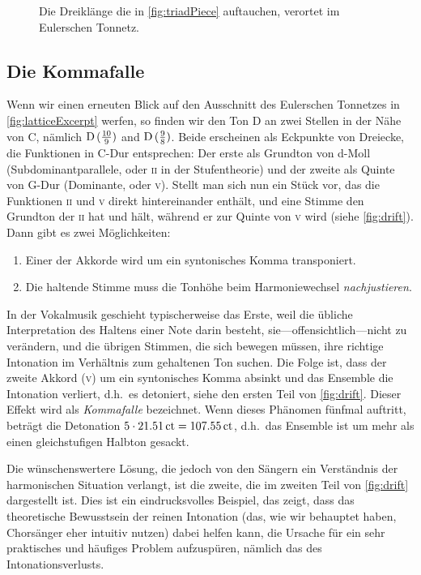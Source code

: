 \documentclass[ngerman,11pt]{scrartcl}
\begin{document}
\begin{figure}
  
  \caption{Die Dreiklänge die in \cref{fig:triadPiece} auftauchen, verortet im
  	Eulerschen Tonnetz.}\label{fig:chordsLattice}
\end{figure}

\subsection{Die Kommafalle}

Wenn wir einen erneuten Blick auf den Ausschnitt des Eulerschen Tonnetzes in \cref{fig:latticeExcerpt} werfen, so finden wir den Ton D an zwei Stellen in der Nähe von C, nämlich \naturalm $\text{D}\,(\frac{10}9)$ and $\text{D}\,(\frac98)$. Beide erscheinen als Eckpunkte von Dreiecke, die Funktionen in C-Dur entsprechen: Der erste als Grundton von d-Moll (Subdominantparallele, oder \textsc{ii} in der Stufentheorie) und der zweite als Quinte von G-Dur (Dominante, oder \textsc{v}). Stellt man sich nun ein Stück vor, das die Funktionen \textsc{ii} und \textsc{v} direkt hintereinander enthält, und eine Stimme den Grundton der \textsc{ii} hat und hält, während er zur Quinte von \textsc{v} wird (siehe \cref{fig:drift}). Dann gibt es zwei Möglichkeiten:


\begin{enumerate}[itemsep=0em]
\item Einer der Akkorde wird um ein syntonisches Komma transponiert.
\item Die haltende Stimme muss die Tonhöhe beim Harmoniewechsel 
  \emph{nachjustieren}.
\end{enumerate}%
%
In der Vokalmusik geschieht typischerweise das Erste, weil die übliche
Interpretation des Haltens einer Note darin besteht, sie—offensichtlich—nicht zu
verändern, und die übrigen Stimmen, die sich bewegen müssen, ihre richtige
Intonation im Verhältnis zum gehaltenen Ton suchen. Die Folge ist, dass der
zweite Akkord (\textsc{v}) um ein syntonisches Komma absinkt und das Ensemble
die Intonation verliert, d.h.\ es detoniert, siehe den ersten Teil von
\cref{fig:drift}. Dieser Effekt wird als \emph{Kommafalle} bezeichnet. Wenn
dieses Phänomen fünfmal auftritt, beträgt die Detonation
$5\cdot 21.51\,\mathrm{ct}=107.55\,\mathrm{ct}$, d.h.\ das Ensemble ist um mehr als
einen gleichstufigen Halbton gesackt.

Die wünschenswertere Lösung, die jedoch von den Sängern ein Verständnis der
harmonischen Situation verlangt, ist die zweite, die im zweiten Teil von
\cref{fig:drift} dargestellt ist. Dies ist ein eindrucksvolles Beispiel, das
zeigt, dass das theoretische Bewusstsein der reinen Intonation (das, wie wir
behauptet haben, Chorsänger eher intuitiv nutzen) dabei helfen kann, die Ursache
für ein sehr praktisches und häufiges Problem aufzuspüren, nämlich das des
Intonationsverlusts.
\end{document}
